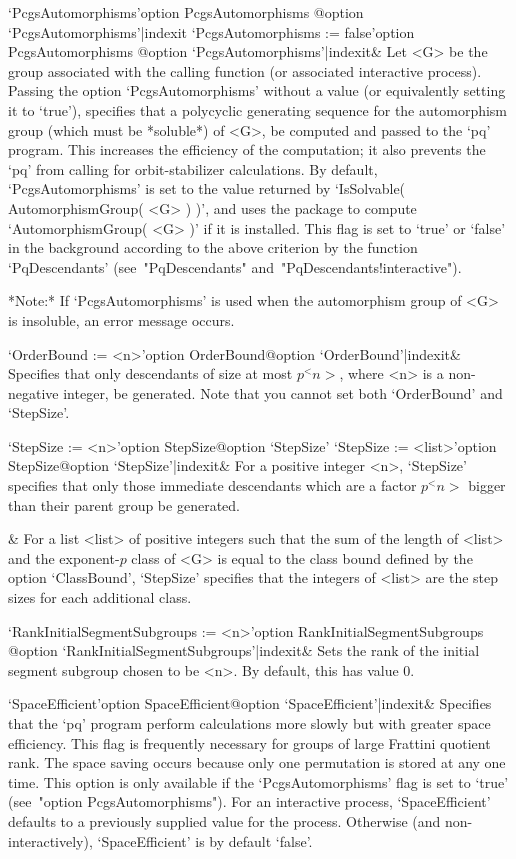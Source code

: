 \>`PcgsAutomorphisms'{option PcgsAutomorphisms}%
@{option `PcgsAutomorphisms'|indexit}
\>`PcgsAutomorphisms := false'{option PcgsAutomorphisms}%
@{option `PcgsAutomorphisms'|indexit}&
Let <G> be the group associated with the calling function (or  associated
interactive process). Passing the option  `PcgsAutomorphisms'  without  a
value (or equivalently setting it to `true'), specifies that a polycyclic
generating sequence for the automorphism group (which must be  *soluble*)
of <G>, be computed and passed to the `pq'  program.  This  increases  the
efficiency of the computation; it also prevents  the  `pq'  from  calling
{\GAP} for orbit-stabilizer calculations. By default, `PcgsAutomorphisms'
is set to the value returned by `IsSolvable( AutomorphismGroup( <G> ) )',
and uses the package {\AutPGrp} to compute `AutomorphismGroup( <G> )'  if
it is installed. This flag is set to `true' or `false' in the  background
according  to  the  above  criterion  by  the  function   `PqDescendants'
(see~"PqDescendants" and~"PqDescendants!interactive").

*Note:*
If `PcgsAutomorphisms' is used when the  automorphism  group  of  <G>  is
insoluble, an error message occurs.

\>`OrderBound := <n>'{option OrderBound}@{option `OrderBound'|indexit}&
Specifies that only descendants of size at most $p^<n>$, where <n>  is  a
non-negative integer,  be  generated.  Note  that  you  cannot  set  both
`OrderBound' and `StepSize'.

\>`StepSize := <n>'{option StepSize}@{option `StepSize'}
\>`StepSize := <list>'{option StepSize}@{option `StepSize'|indexit}&
For  a  positive  integer  <n>,  `StepSize'  specifies  that  only  those
immediate descendants which are a factor $p^<n>$ bigger than their parent
group be generated.

&
For a list <list> of positive integers such that the sum of the length of
<list> and the exponent-$p$ class of <G> is  equal  to  the  class  bound
defined  by  the  option  `ClassBound',  `StepSize'  specifies  that  the
integers of <list> are the step sizes for each additional class.

\>`RankInitialSegmentSubgroups := <n>'{option RankInitialSegmentSubgroups}%
@{option `RankInitialSegmentSubgroups'|indexit}&
Sets the rank of the initial  segment  subgroup  chosen  to  be  <n>.  By
default, this has value 0.

\>`SpaceEfficient'{option SpaceEfficient}@{option `SpaceEfficient'|indexit}&
Specifies that the `pq' program perform calculations more slowly but  with
greater space efficiency. This flag is frequently necessary for groups of
large Frattini quotient rank. The space saving occurs  because  only  one
permutation is stored at any one time. This option is only  available  if
the   `PcgsAutomorphisms'   flag   is   set   to   `true'    (see~"option
PcgsAutomorphisms").  For  an   interactive   process,   `SpaceEfficient'
defaults to a previously supplied value for the process.  Otherwise  (and
non-interactively), `SpaceEfficient' is by default `false'.


